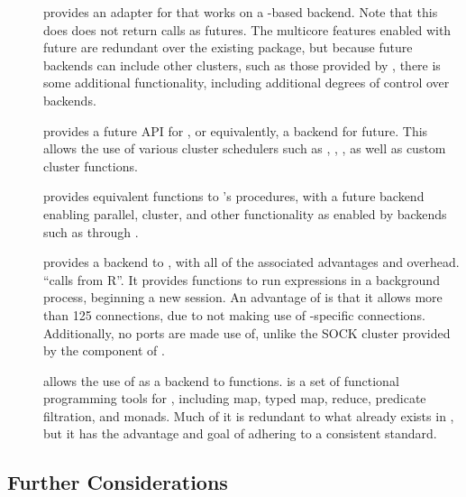 \begin{description}
	\item[]
		\textcite{bengtsson20do} provides an adapter for \cite{microsoft20}
		that works on a -based backend.
		Note that this does does not return  calls as futures.
		The multicore features enabled with future are redundant over the existing  package, but because future backends can include other clusters, such as those provided by , there is some additional functionality, including additional degrees of control over backends.
	\item[]
		\cite{bengtsson19batch} provides a future API for
		\cite{lang17}, or equivalently, a  backend for
		future.
		This allows the use of various cluster schedulers such as , , , as well as custom cluster functions.
	\item[]
		\textcite{bengtsson20apply} provides equivalent functions to \R{}'s
		 procedures, with a future backend enabling parallel,
		cluster, and other functionality as enabled by backends such as
		 through .
	\item[]
		\textcite{bengtsson19callr} provides a \cite{csardi20} backend to
		, with all of the associated advantages and overhead. 
		``calls \R{} from R''.
		It provides functions to run expressions in a background \R{} process, beginning a new session.
		An advantage of  is that it allows more than 125 connections, due to not making use of \R{}-specific connections.
		Additionally, no ports are made use of, unlike the SOCK cluster provided by the  component of .
	\item[]
		\textcite{vaughan18} allows the use of  as a backend to 
		functions.  is a set of functional programming tools for \R{},
		including map, typed map, reduce, predicate filtration, and monads.
		Much of it is redundant to what already exists in \R{}, but it has the advantage and goal of adhering to a consistent standard.
\end{description}

\subsection{Further Considerations}\label{subsec:further-considerations}

